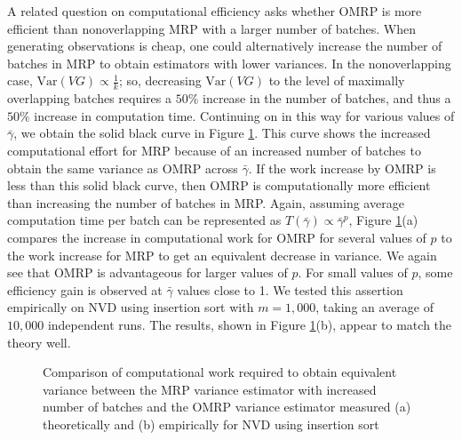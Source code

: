 \documentclass[12pt]{article}
\newcommand{\var}[1]{\mathrm{Var} \left( #1 \right)}
\newcommand{\gammab}{\bar{\gamma}}
\begin{document}
A related question on computational efficiency asks whether OMRP is more efficient than nonoverlapping MRP with a larger number of batches.
When generating observations is cheap, one could alternatively increase the number of batches in MRP to obtain estimators with lower variances. 
In the nonoverlapping case, $\var{VG} \propto \frac{1}{k}$; so, decreasing $\var{VG}$ to the level of maximally overlapping batches requires a $50\%$ increase in the number of batches, and thus a $50\%$ increase in computation time.
Continuing on in this way for various values of $\gammab$, we obtain the solid black curve in Figure \ref{fig:comp_work_comparison}. 
This curve shows the increased computational effort for MRP because of an increased number of batches to obtain the same variance as OMRP across $\gammab$.
If the work increase by OMRP is less than this solid black curve, then OMRP is computationally more efficient than increasing the number of batches in MRP. 
Again, assuming average computation time per batch can be represented as $T(\gammab) \propto \gammab^p$, Figure \ref{fig:comp_work_comparison}(a) compares the increase in computational work for OMRP for several values of $p$ to the work increase for MRP to get an equivalent decrease in variance.
We again see that OMRP is advantageous for larger values of $p$.
For small values of $p$, some efficiency gain is observed at $\gammab$ values close to 1.
We tested this assertion empirically on NVD using insertion sort with $m=1,000$, taking an average of $10,000$ independent runs. 
The results, shown in Figure \ref{fig:comp_work_comparison}(b), appear to match the theory well. 


\begin{figure}[htb!]
	\centering
		\caption{
		Comparison of computational work required to obtain equivalent variance between the MRP variance estimator with increased number of batches and the OMRP variance estimator measured
		(a) theoretically and 
		(b) empirically for NVD using insertion sort
		}
\label{fig:comp_work_comparison}
\end{figure}
\end{document}
